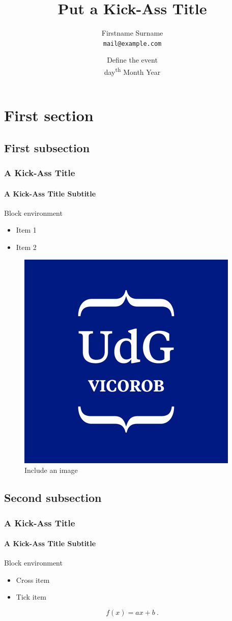 \documentclass[10p]{beamer}
\title{Put a Kick-Ass Title}
\author{Firstname Surname \\ \texttt{mail@example.com}}
\date{Define the event \\ day\textsuperscript{th} Month Year}
\institute{Universitat de Girona}
\newcommand{\tick}{\color{green!60!black!80}\ding{51}}
\newcommand{\cross}{\color{red!60!black!80}\ding{55}}
\begin{document}
\begin{frame}
  \titlepage
\end{frame}

\begin{frame}
  \tableofcontents[sectionstyle=show,subsectionstyle=show,subsubsectionstyle=hide]
\end{frame}

\section{First section}

\subsection{First subsection}

\begin{frame}
  \frametitle{A Kick-Ass Title}
  \framesubtitle{A Kick-Ass Title Subtitle}
  \begin{block}{Block environment}
    \begin{itemize}
    \item Item 1
    \item Item 2
    \end{itemize}
  \end{block}
  \begin{figure}
    \centering
    \includegraphics[width=.2\textwidth]{./images/logos/vicorob-logo-new.png}
    \caption{Include an image}
  \end{figure}
\end{frame}

\subsection{Second subsection}

\begin{frame}
  \frametitle{A Kick-Ass Title}
  \framesubtitle{A Kick-Ass Title Subtitle}
  \begin{block}{Block environment}
    \begin{itemize}
    \item[\cross] Cross item
    \item[\tick] Tick item
    \end{itemize}
  \end{block}
  \begin{equation}
    \label{eq:eq1}
    f(x)=ax+b \ .
  \end{equation}
\end{frame}
\end{document}
